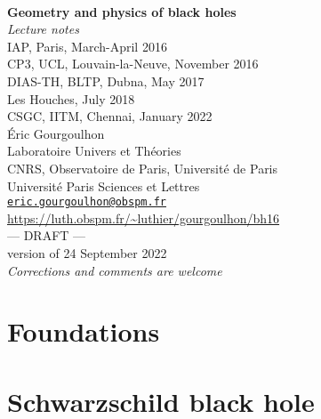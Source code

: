 \documentclass[12pt,a4paper]{book}
\begin{document}
\begin{titlepage}
\
\vspace{4cm}
\begin{center}
{\Huge\textbf{Geometry and physics of black holes}}\\[2ex]
{\Huge\emph{Lecture notes}}\\[3ex]
{\Large IAP, Paris, March-April 2016} \\[1ex]
{\Large CP3, UCL, Louvain-la-Neuve, November 2016}\\[1ex]
{\Large DIAS-TH, BLTP, Dubna, May 2017}\\[1ex]
{\Large Les Houches, July 2018}\\[1ex]
{\Large CSGC, IITM, Chennai, January 2022}\\[8ex]
Éric Gourgoulhon \\
Laboratoire Univers et Théories \\
CNRS, Observatoire de Paris, Université de Paris\\
Université Paris Sciences et Lettres\\
\href{mailto:eric.gourgoulhon@obspm.fr}{\texttt{eric.gourgoulhon@obspm.fr}}\\[8ex]
\url{https://luth.obspm.fr/~luthier/gourgoulhon/bh16}\\[8ex]
{\Huge --- DRAFT ---}\\[2ex]
{version of 24 September 2022}\\[2ex]
\emph{\Large Corrections and comments are welcome}
\end{center}
\end{titlepage}


\dominitoc

\newpage


\tableofcontents

\part{Foundations}






\part{Schwarzschild black hole}
\end{document}

